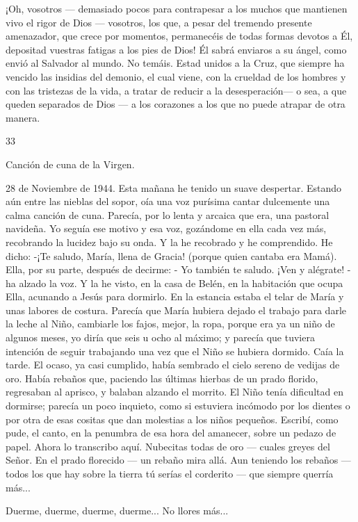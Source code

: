 \documentclass[12pt]{book} %
\begin{document}
¡Oh, vosotros — demasiado pocos para contrapesar a los muchos que mantienen vivo el rigor de Dios — vosotros, los que, a pesar del tremendo presente amenazador, que crece por momentos, permanecéis de todas formas devotos a Él, depositad vuestras fatigas a los pies de Dios! Él sabrá enviaros a su ángel, como envió al Salvador al mundo. No temáis. Estad unidos a la Cruz, que siempre ha vencido las insidias del demonio, el cual viene, con la crueldad de los hombres y con las tristezas de la vida, a tratar de reducir a la desesperación— o sea, a que queden separados de Dios — a los corazones a los que no puede atrapar de otra manera. 
 
 
33 
 
Canción de cuna de la Virgen. 
 
28 de Noviembre de 1944. 
Esta mañana he tenido un suave despertar. Estando aún entre las nieblas del sopor, oía una voz purísima cantar 
dulcemente una calma canción de cuna. Parecía, por lo lenta y arcaica que era, una pastoral navideña. Yo seguía ese motivo y esa voz, gozándome en ella cada vez más, recobrando la lucidez bajo su onda. Y la he recobrado y he comprendido. He dicho: -¡Te saludo, María, llena de Gracia! (porque quien cantaba era Mamá). Ella, por su parte, después de decirme: 
- Yo también te saludo. ¡Ven y alégrate! - ha alzado la voz. 
Y la he visto, en la casa de Belén, en la habitación que ocupa Ella, acunando a Jesús para dormirlo. En la estancia estaba 
el telar de María y unas labores de costura. Parecía que María hubiera dejado el trabajo para darle la leche al Niño, cambiarle los fajos, mejor, la ropa, porque era ya un niño de algunos meses, yo diría que seis u ocho al máximo; y parecía que tuviera intención de seguir trabajando una vez que el Niño se hubiera dormido. 
Caía la tarde. El ocaso, ya casi cumplido, había sembrado el cielo sereno de vedijas de oro. Había rebaños que, paciendo 
las últimas hierbas de un prado florido, regresaban al aprisco, y balaban alzando el morrito. 
El Niño tenía dificultad en dormirse; parecía un poco inquieto, como si estuviera incómodo por los dientes o por otra de 
esas cositas que dan molestias a los niños pequeños. 
Escribí, como pude, el canto, en la penumbra de esa hora del amanecer, sobre un pedazo de papel. Ahora lo transcribo 
aquí. 
Nubecitas todas de oro — cuales greyes del Señor. 
En el prado florecido — un rebaño mira allá. 
Aun teniendo los rebaños — todos los que hay sobre la tierra tú serías el corderito — que siempre querría más... 
 
Duerme, duerme, duerme, duerme... No llores más... 
 
\end{document}

